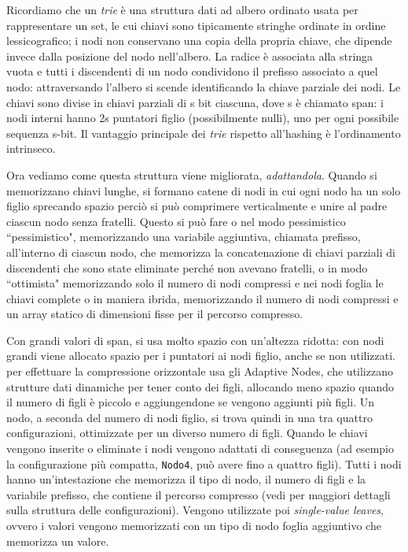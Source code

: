 \documentclass[../main.tex]{subfiles}
\begin{document}
Ricordiamo che un \textit{trie} è una struttura dati ad albero ordinato usata per rappresentare un set, le cui chiavi sono tipicamente stringhe ordinate in ordine lessicografico; i nodi non conservano una copia della propria chiave, che dipende invece dalla posizione del nodo nell'albero. La radice è associata alla stringa vuota e tutti i discendenti di un nodo condividono il prefisso associato a quel nodo: attraversando l'albero si scende identificando la chiave parziale dei nodi. Le chiavi sono divise in chiavi parziali di s bit ciascuna, dove s è chiamato span: i nodi interni hanno 2s puntatori figlio (possibilmente nulli), uno per ogni possibile sequenza s-bit. Il vantaggio principale dei \textit{trie} rispetto all'hashing è l'ordinamento intrinseco. 

Ora vediamo come questa struttura viene migliorata, \textit{adattandola}. Quando si memorizzano chiavi lunghe, si formano catene di nodi in cui ogni nodo ha un solo figlio sprecando spazio perciò si può comprimere verticalmente e unire al padre ciascun nodo senza fratelli. Questo si può fare o nel modo pessimistico ``pessimistico", memorizzando una variabile aggiuntiva, chiamata prefisso, all'interno di ciascun nodo, che memorizza la concatenazione di chiavi parziali di discendenti che sono state eliminate perché non avevano fratelli, o in modo ``ottimista" memorizzando solo il numero di nodi compressi e nei nodi foglia le chiavi complete o in maniera ibrida, memorizzando il numero di nodi compressi e un array statico di dimensioni fisse per il percorso compresso.

Con grandi valori di span, si usa molto spazio con un'altezza ridotta: con nodi grandi viene allocato spazio per i puntatori ai nodi figlio, anche se non utilizzati. \cite{leis2013art} per effettuare la compressione orizzontale usa gli Adaptive Nodes, che utilizzano strutture dati dinamiche per tener conto dei figli, allocando meno spazio quando il numero di figli è piccolo e aggiungendone se vengono aggiunti più figli. Un nodo, a seconda del numero di nodi figlio, si trova quindi in una tra quattro configurazioni, ottimizzate per un diverso numero di figli. Quando le chiavi vengono inserite o eliminate i nodi vengono adattati di conseguenza (ad esempio la configurazione più compatta, \texttt{Nodo4}, può avere fino a quattro figli). Tutti i nodi hanno un'intestazione che memorizza il tipo di nodo, il numero di figli e la variabile prefisso, che contiene il percorso compresso (vedi \cite{leis2013art} per maggiori dettagli sulla struttura delle configurazioni). Vengono utilizzate poi \textit{single-value leaves}, ovvero i valori vengono memorizzati con un tipo di nodo foglia aggiuntivo che memorizza un valore.
\end{document}
